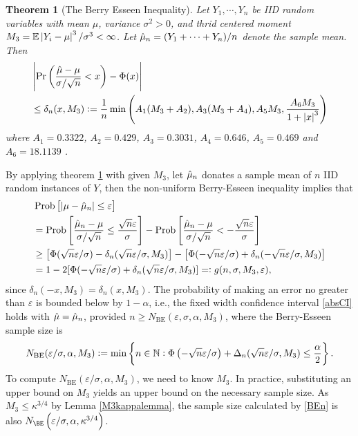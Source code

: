 \documentclass{iitthesis}
\newtheorem{theorem}{Theorem}[section]
\begin{document}
\begin{theorem}[The Berry Esseen Inequality] \label{BEThm}
Let $Y_1,\cdots,Y_n$ be IID random variables with mean $\mu$, variance $\sigma^2 >0$, and thrid centered moment $M_3 = \mathbb{E}\left \lvert Y_i-\mu \right \rvert^3/\sigma^3 < \infty$. Let $\hat{\mu}_n = (Y_1+\cdots+Y_n)/n$ denote the sample mean. Then
\begin{align}
&\left \lvert \Pr\left(\frac{\hat{\mu}-\mu}{\sigma/\sqrt{n}}<x\right)-\Phi(x) \right \rvert\\
& \leq \delta_n(x,M_3):=\frac{1}{n}\min\left( A_1(M_3+A_2),  A_3(M_3+A_4), A_5M_3, \frac{A_6M_3}{1+\left \lvert x \right \rvert^3}\right)
\end{align}
where $A_1 = 0.3322$, $A_2 = 0.429$, $A_3=0.3031$, $A_4=0.646$, $A_5=0.469$ \cite{She13} and $A_6=18.1139$ \cite{NeShe12}.
\end{theorem}
By applying theorem \ref{BEThm} with given $M_3$, let $\hat{\mu}_n$ donates a sample mean of $n$ IID random instances of $Y$, then the non-uniform Berry-Esseen inequality implies that
\begin{align} 
&\operatorname{Prob}\left[\left \lvert \mu-\hat{\mu}_n \right \rvert  \le \varepsilon \right]\nonumber\\
&=\operatorname{Prob}\left[\frac{\hat{\mu}_n - \mu}{\sigma/\sqrt{n}} \le \frac{\sqrt{n}\varepsilon}{\sigma} \right]-\operatorname{Prob}\left[\frac{\hat{\mu}_n - \mu}{\sigma/\sqrt{n}} < -\frac{\sqrt{n}\varepsilon}{\sigma}\right] \nonumber \\ 
&\ge \left[\Phi(\sqrt{n}\varepsilon/\sigma)-\delta_n(\sqrt{n}\varepsilon/\sigma,M_3)\right] -\left[\Phi(-\sqrt{n}\varepsilon/\sigma) + \delta_n(-\sqrt{n}\varepsilon/\sigma,M_3)\right] \nonumber \\
&=1-2[\Phi(-\sqrt{n}\varepsilon/\sigma) + \delta_n(\sqrt{n}\varepsilon/\sigma,M_3)] =: g(n, \sigma, M_3, \varepsilon), \label{BEresult}
\end{align}
since $\delta_n(-x,M_3)=\delta_n(x,M_3)$.  The probability of
making an error no greater than $\varepsilon$ is bounded below by $1-\alpha$, i.e., the fixed width confidence interval \eqref{absCI} holds with $\hat{\mu}=\hat{\mu}_n$, provided $n \ge N_{\text{BE}}(\varepsilon,\sigma,\alpha,M_3)$, where the Berry-Esseen sample size is
\begin{equation}\label{BEn}
N_{\text{BE}}(\varepsilon/\sigma,\alpha,M_3) := \min  \left \{ n \in \mathbb{N} : \Phi\left(-\sqrt{n}\varepsilon/\sigma  \right)+\Delta_n(\sqrt{n}\varepsilon/\sigma,M_3)
\le \frac{\alpha}{2} \right \}.
\end{equation}
To compute $N_{\text{BE}}(\varepsilon/\sigma,\alpha,M_3)$, we need to know
$M_3$. In practice, substituting an upper bound on $M_3$ yields an upper bound on the necessary sample size.
As $M_3 \leq \kappa^{3/4}$ by Lemma \ref{M3kappalemma}, the sample size calculated by \eqref{BEn} is also $N_{\BE}\left(\varepsilon/\sigma,\alpha,\kappa^{3/4}\right) $.
\end{document}
